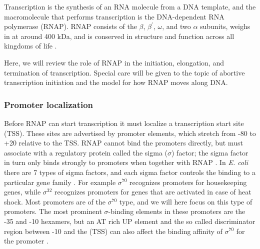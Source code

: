 %
%
Transcription is the synthesis of an RNA molecule from a DNA template, and the
macromolecule that performs transcription is the DNA-dependent RNA polymerase
(RNAP). RNAP consists of the $\beta$, $\beta^{\prime}$, $\omega$, and two
$\alpha$ subunits, weighs in at around 400 kDa, and is conserved in structure
and function across all kingdoms of life \cite{borukhov_rna_2008}.

Here, we will review the role of RNAP in the initiation, elongation, and
termination of transcription. Special care will be given to the topic of
abortive transcription initiation and the model for how RNAP moves along DNA.

\subsubsection{Promoter localization}
Before RNAP can start transcription it must localize a transcription start site
(TSS). These sites are advertised by promoter elements, which stretch from -80
to +20 relative to the TSS. RNAP cannot bind the promoters directly, but must
associate with a regulatory protein called the sigma ($\sigma$) factor; the
sigma factor in turn only binds strongly to promoters when together with RNAP
\cite{paget_70_2003}. In \textit{E. coli} there are 7 types of sigma factors,
and each sigma factor controls the binding to a particular gene family
\cite{osterberg_regulation_2011}. For example $\sigma^{70}$ recognizes
promoters for housekeeping genes, while $\sigma^{32}$ recognizes promoters for
genes that are activated in case of heat shock. Most promoters are of the
$\sigma^{70}$ type, and we will here focus on this type of promoters. The most
prominent $\sigma$-binding elements in these promoters are the -35 and -10
hexamers, but an AT rich UP element and the so called discriminator region
between -10 and the (TSS) can also affect the binding affinity of $\sigma^{70}$
for the promoter \cite{ross_third_1993} \cite{haugen_fine_2008}.

